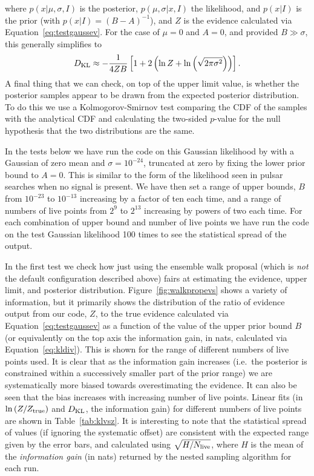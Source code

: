 where $p(x|\mu,\sigma,I)$ is the posterior, $p(\mu,\sigma|x,I)$ the likelihood, and $p(x|I)$ is the prior (with $p(x|I) = (B-A)^{-1}$), and $Z$ is the
evidence calculated via Equation~\ref{eq:testgaussev}. For the case of $\mu=0$ and $A=0$, and provided $B \gg \sigma$, this generally simplifies
to
\begin{equation}
D_{\rm KL} \approx -\frac{1}{4ZB}\left[1+2\left(\ln{Z} +\ln{\left(\sqrt{2\pi\sigma^2}\right)}\right)\right].
\end{equation}
A final thing that we can check, on top of the upper limit value, is whether the posterior samples appear to be drawn from the expected
posterior distribution. To do this we use a Kolmogorov-Smirnov test comparing the CDF of the samples with the analytical CDF and calculating the
two-sided $p$-value for the null hypothesis that the two distributions are the same.

In the tests below we have run the code on this Gaussian likelihood by with a Gaussian of zero mean and $\sigma = 10^{-24}$, truncated at zero
by fixing the lower prior bound to $A=0$. This is similar to the form of the likelihood seen in pulsar searches when no signal is present.
We have then set a range of upper bounds, $B$ from $10^{-23}$ to $10^{-13}$ increasing by a factor of ten each time, and a range of numbers of
live points from $2^9$ to $2^{13}$ increasing by powers of two each time. For each combination of upper bound and number of live points we have
run the code on the test Gaussian likelihood 100 times to see the statistical spread of the output.

In the first test we check how just using the ensemble walk proposal (which is {\it not} the default configuration described above) fairs at
estimating the evidence, upper limit, and posterior distribution. Figure~\ref{fig:walkpropevs} shows a variety of information, but it
primarily shows the distribution of the ratio of evidence output from our code, $Z$, to the true evidence calculated via
Equation~\ref{eq:testgaussev} as a function of the value of the upper prior bound $B$ (or equivalently on the top axis the
information gain, in nats, calculated via Equation~\ref{eq:kldiv}). This is shown for the range of different numbers of live points used.
It is clear that as the information gain increases (i.e.\ the posterior is constrained within a successively smaller part of the
prior range) we are systematically more biased towards overestimating the evidence. It can also be seen that the bias increases with
increasing number of live points. Linear fits (in $\ln{(Z/Z_{\rm true})}$ and $D_{\rm KL}$, the information gain) for different numbers
of live points are shown in Table~\ref{tab:klvsz}. It is interesting to note that the statistical spread of values (if ignoring the
systematic offset) are consistent with the expected range given by the error bars, and calculated using $\sqrt{H/N_{\rm live}}$, where
$H$ is the mean of the {\it information gain} (in nats) returned by the nested sampling algorithm for each run.

